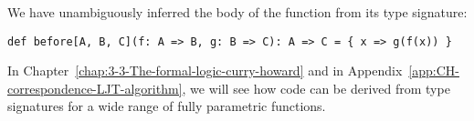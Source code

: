 We have unambiguously inferred the body of the function from its type
signature:
\begin{lstlisting}
def before[A, B, C](f: A => B, g: B => C): A => C = { x => g(f(x)) }
\end{lstlisting}

In Chapter~\ref{chap:3-3-The-formal-logic-curry-howard} and in Appendix~\ref{app:CH-correspondence-LJT-algorithm},
we will see how code can be derived from type signatures for a wide
range of fully parametric functions.
